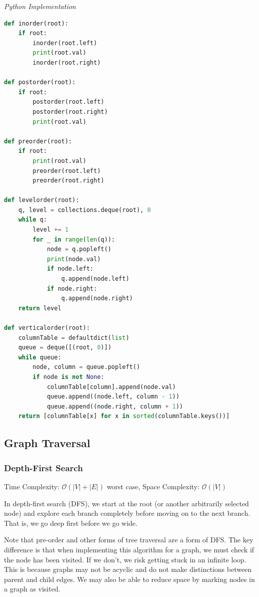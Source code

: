 \documentclass{article}
\newcommand{\bigO}{\mathcal{O}}
\begin{document}
\vspace{8pt} \emph{Python Implementation}
\begin{lstlisting}[language=Python]  
def inorder(root): 
    if root: 
        inorder(root.left) 
        print(root.val)
        inorder(root.right) 
  
def postorder(root): 
    if root: 
        postorder(root.left) 
        postorder(root.right) 
        print(root.val)
        
def preorder(root): 
    if root: 
        print(root.val)
        preorder(root.left) 
        preorder(root.right)
        
def levelorder(root):
    q, level = collections.deque(root), 0
    while q:
        level += 1
        for _ in range(len(q)):
            node = q.popleft()
            print(node.val)
            if node.left:
                q.append(node.left)
            if node.right:
                q.append(node.right)
    return level
    
def verticalorder(root):
    columnTable = defaultdict(list)
    queue = deque([(root, 0)])
    while queue:
        node, column = queue.popleft()
        if node is not None:
            columnTable[column].append(node.val)
            queue.append((node.left, column - 1))
            queue.append((node.right, column + 1))
    return [columnTable[x] for x in sorted(columnTable.keys())]
\end{lstlisting}
    \subsection{Graph Traversal}

    \subsubsection{Depth-First Search }
    Time Complexity: $\bigO(|V| + |E|)$ worst case, Space Complexity: $\bigO(|V|)$
    
    In depth-first search (DFS), we start at the root (or another arbitrarily selected node) and explore each branch completely before moving on to the next branch. That is, we go deep first before we go wide. 
    
    
    Note that pre-order and other forms of tree traversal are a form of DFS. The key difference is that when implementing this algorithm for a graph, we must check if the node has been visited. If we don't, we risk getting stuck in an infinite loop. This is because graphs may not be acyclic and do not make distinctions between parent and child edges. We may also be able to reduce space by marking nodes in a graph as visited.
    
\end{document}

